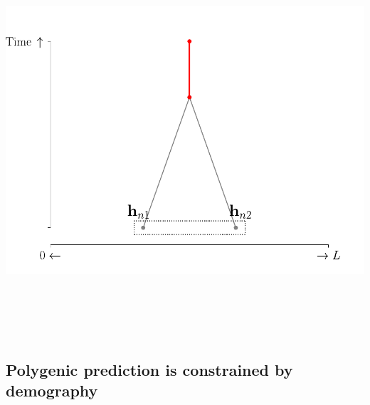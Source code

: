 \documentclass[
  letterpaper,
  DIV=11,
  numbers=noendperiod]{scrartcl}
\begin{document}
\begin{center}
\includegraphics[width=\linewidth,height=5.72917in,keepaspectratio]{slides_files/mediabag/imgs/covariance-long-1.pdf}
\end{center}

\subsection{Polygenic prediction is constrained by
demography}\label{polygenic-prediction-is-constrained-by-demography}
\end{document}
